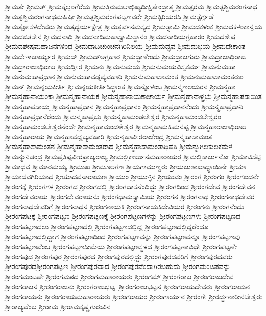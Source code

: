 {ಶ್ರೀಮತೇ
ಶ್ರೀಮತ್
ಶ್ರೀಮತ್ಕೆಲ್ಲಂಗೆರೆಯ
ಶ್ರೀಮತ್ತಿರುಮಲಾಭಿಖ್ಯದೀಕ್ಷಿತೇಂದ್ರಾತ್ಮ
ಶ್ರೀಮತ್ಪರಮ
ಶ್ರೀಮತ್ಪಶ್ಚಿಮರಂಗನಾಥ
ಶ್ರೀಮತ್ಪಶ್ಚಿಮರಂಗನಾಥಮಹಿಷೀ
ಶ್ರೀಮತ್ಪಶ್ಚಿಮರಂಗಪಟ್ಟಣವರೇ
ಶ್ರೀಮತ್ಪಿರಿಯರಸಿ
ಶ್ರೀಮತ್ಪೆರ್ಗ್ಗಡೆ
ಶ್ರೀಮತ್ಪೋಸಳದೇವರು
ಶ್ರೀಮತ್ಸದ್ಭರ್ಯಕ್ಷೇತ್ರ
ಶ್ರೀಮತ್ಸರ್ವನಮಸ್ಯದ
ಶ್ರೀಮತ್ಸಾಮಿ
ಶ್ರೀಮದಕಳಂಕ
ಶ್ರೀಮದಕಳಂಕಾನ್ವಯ
ಶ್ರೀಮದಜಿತಸೇನ
ಶ್ರೀಮದನಾದಿ
ಶ್ರೀಮದನಾದಿಮಹಾಸ್ವಾಮಿಸ್ಥಾನಂ
ಶ್ರೀಮದನಾದಿಯಗ್ರಹಾರಂ
ಶ್ರೀಮದಶೇಷ
ಶ್ರೀಮದಶೇಷಮಹಾಜನಗಳಿಂದ
ಶ್ರೀಮದಾದಿಚುಂಚನಗಿರಿನಿಲಯ
ಶ್ರೀಮದುದ್ಭವ
ಶ್ರೀಮದುಭಯ
ಶ್ರೀಮದೇಕಾಂತ
ಶ್ರೀಮದೇಳಾಚಾರ್ಯ್ಯರ
ಶ್ರೀಮದ್
ಶ್ರೀಮದ್ಅಗ್ರಹಾರ
ಶ್ರೀಮದ್ಭಾಳೇಂದು
ಶ್ರೀಮದ್ರಾಜಗುರು
ಶ್ರೀಮದ್ರಾಜಾಧಿರಾಜ
ಶ್ರೀಮದ್ರಾರಾಜಾಧಿರಾಜ
ಶ್ರೀಮದ್ವೀರ
ಶ್ರೀಮನು
ಶ್ರೀಮನುಮಯ
ಶ್ರೀಮನುಮಯವಿಸ್ವಕರ್ಮ
ಶ್ರೀಮನುಮಹಾ
ಶ್ರೀಮನುಮಹಾಪ್ರಧಾನ
ಶ್ರೀಮನುಮಹಾವಡ್ಡವ್ಯವಹಾರಿ
ಶ್ರೀಮನುಮಹಾಸಾಮಂತ
ಶ್ರೀಮನುಮಹಾಸಾಮಂತರುಂ
ಶ್ರೀಮನ್
ಶ್ರೀಮನ್ನಯಕೀರ್ತಿ
ಶ್ರೀಮನ್ನಯಕೀರ್ತಿಸಿದ್ಧಾಂತ
ಶ್ರೀಮನ್ನೊಳಂಬ
ಶ್ರೀಮನ್ಮಣಲಯರನ
ಶ್ರೀಮನ್ಮಹಾ
ಶ್ರೀಮನ್ಮಹಾನಾಯಂಕಾ
ಶ್ರೀಮನ್ಮಹಾನಾಯಕ
ಶ್ರೀಮನ್ಮಹಾನಾಯಕಾಚಾರ್ಯ
ಶ್ರೀಮನ್ಮಹಾನಾಳ್ಪ್ರಭು
ಶ್ರೀಮನ್ಮಹಾಪಸಾಯಿತ
ಶ್ರೀಮನ್ಮಹಾಪಸಾಯ್ತ
ಶ್ರೀಮನ್ಮಹಾಪ್ರಧಾನ
ಶ್ರೀಮನ್ಮಹಾಪ್ರಧಾನಂ
ಶ್ರೀಮನ್ಮಹಾಪ್ರಧಾನನೆಂದು
ಶ್ರೀಮನ್ಮಹಾಪ್ರಧಾನಿ
ಶ್ರೀಮನ್ಮಹಾಪ್ರಧಾನೆರೆಂದು
ಶ್ರೀಮನ್ಮಹಾಪ್ರಭು
ಶ್ರೀಮನ್ಮಹಾಮಂಡಲೇಶ್ವರ
ಶ್ರೀಮನ್ಮಹಾಮಂಡಲೇಶ್ವರಂ
ಶ್ರೀಮನ್ಮಹಾಮಂಡಲೇಶ್ವರನೆಂದೇ
ಶ್ರೀಮನ್ಮಹಾಮಂಡಳೇಶ್ವರ
ಶ್ರೀಮನ್ಮಹಾಮಹಿಮನಪ್ಪ
ಶ್ರೀಮನ್ಮಹಾರಾಜಾಧಿರಾಜ
ಶ್ರೀಮನ್ಮಹಾರಾಯ
ಶ್ರೀಮನ್ಮಹಾವಡ್ಡಬ್ಯವಹಾರಿ
ಶ್ರೀಮನ್ಮಹಾವೀರರಾಜೇಂದ್ರ
ಶ್ರೀಮನ್ಮಹಾಸಾಮಂತ
ಶ್ರೀಮನ್ಮಹಾಸಾಮಂತನ
ಶ್ರೀಮನ್ಮಹಾಸಾಮಂತರಾದ
ಶ್ರೀಮನ್ಮಹಾಸಾಮಂತಾಧಿಪತಿ
ಶ್ರೀಮನ್ಮುಗಿಲಕುಲಕಮಳ
ಶ್ರೀಮನ್ಮುನಿಚಂದ್ರ
ಶ್ರೀಮಪ್ರತಿಷ್ಟವೀರಪ್ರಾಜ್ಯರಾಜ್ಯ
ಶ್ರೀಮಲ್ಲಿಕಾರ್ಜುನಮಹಾರಾಯರ
ಶ್ರೀಮಲ್ಲಿಕಾರ್ಜುನೋ
ಶ್ರೀಮಾಚಿಸೆಟ್ಟಿ
ಶ್ರೀಮಾಧವ
ಶ್ರೀಮಾರಮಯ್ಯ
ಶ್ರೀಮುಖ
ಶ್ರೀಮೂಲಗಣ
ಶ್ರೀಯಗಾಮುಣ್ಡರು
ಶ್ರೀಯಜುಶಾಖಾಧ್ಯಾಯಿನೇ
ಶ್ರೀಯಾ
ಶ್ರೀಯಾದವಗಿರಿಯಾದ
ಶ್ರೀಯಾದವನಾರಾಯಣ
ಶ್ರೀಯುಂ
ಶ್ರೀಯುಳ್ಳಿನ
ಶ್ರೀಯುವಂ
ಶ್ರೀರಂಗ
ಶ್ರೀರಂಗಂ
ಶ್ರೀರಂಗಐದನೇ
ಶ್ರೀರಂಗಕ್ಕೆ
ಶ್ರೀರಂಗಗಳ
ಶ್ರೀರಂಗದ
ಶ್ರೀರಂಗದಲ್ಲಿ
ಶ್ರೀರಂಗದಾಸನೆಂದಿದ್ದು
ಶ್ರೀರಂಗದಿಂದ
ಶ್ರೀರಂಗದೇವ
ಶ್ರೀರಂಗದೇವನ
ಶ್ರೀರಂಗದೇವರಾಯ
ಶ್ರೀರಂಗದೇವರಾಯನು
ಶ್ರೀರಂಗಧಾಮಸ್ವಾಮಿಯ
ಶ್ರೀರಂಗನ
ಶ್ರೀರಂಗನಾಥ
ಶ್ರೀರಂಗನಾಥದೇವರ
ಶ್ರೀರಂಗನಾಥದೇವರಿಗೆ
ಶ್ರೀರಂಗನಾಥನ
ಶ್ರೀರಂಗನಾಯಕಿ
ಶ್ರೀರಂಗನಾಯಕಿದೇವಿಯರ
ಶ್ರೀರಂಗನು
ಶ್ರೀರಂಗನೆಂದು
ಶ್ರೀರಂಗಪಟಕ್ಕೆ
ಶ್ರೀರಂಗಪಟ್ಟಣ
ಶ್ರೀರಂಗಪಟ್ಟಣಕ್ಕೆ
ಶ್ರೀರಂಗಪಟ್ಟಣಗಳನ್ನು
ಶ್ರೀರಂಗಪಟ್ಟಣಗಳು
ಶ್ರೀರಂಗಪಟ್ಟಣದ
ಶ್ರೀರಂಗಪಟ್ಟಣದಲು
ಶ್ರೀರಂಗಪಟ್ಟಣದಲ್ಲಿ
ಶ್ರೀರಂಗಪಟ್ಟಣದಲ್ಲಿದ್ದ
ಶ್ರೀರಂಗಪಟ್ಟಣದಲ್ಲಿದ್ದರೆಂದೂ
ಶ್ರೀರಂಗಪಟ್ಟಣದಲ್ಲಿದ್ದಾಗ
ಶ್ರೀರಂಗಪಟ್ಟಣದಿಂದ
ಶ್ರೀರಂಗಪಟ್ಟಣವನ್ನು
ಶ್ರೀರಂಗಪಟ್ಟಣವನ್ನೂ
ಶ್ರೀರಂಗಪಟ್ಟಣವು
ಶ್ರೀರಂಗಪಟ್ಟಣವೆಂಬ
ಶ್ರೀರಂಗಪಟ್ಟಣಸೀಮೆಯ
ಶ್ರೀರಂಗಪಟ್ಟಣಸ್ಥಳದ
ಶ್ರೀರಂಗಪಟ್ಟಣಾಭಿಧೇ
ಶ್ರೀರಂಗಪಟ್ಟಣೇ
ಶ್ರೀರಂಗಪುದ
ಶ್ರೀರಂಗಪುರ
ಶ್ರೀರಂಗಪುರದ
ಶ್ರೀರಂಗಪುರದಲ್ಲಿದ್ದು
ಶ್ರೀರಂಗಪುರದವರಿಗೆ
ಶ್ರೀರಂಗಪುರದವರು
ಶ್ರೀರಂಗಪುರದಶ್ರೀರಂಗಪಟ್ಟಣ
ಶ್ರೀರಂಗಪುರವಾದ
ಶ್ರೀರಂಗಪುರವೆಂದಾಗಿರಬಹುದು
ಶ್ರೀರಂಗಮಂಟಪವನ್ನು
ಶ್ರೀರಂಗಮಂಟಪೇ
ಶ್ರೀರಂಗಮಠದ
ಶ್ರೀರಂಗಮಹಾರಾಯರು
ಶ್ರೀರಂಗಮ್
ಶ್ರೀರಂಗರಾಜ
ಶ್ರೀರಂಗರಾಜದೇವ
ಶ್ರೀರಂಗರಾಜನ
ಶ್ರೀರಂಗರಾಜನು
ಶ್ರೀರಂಗರಾಜಭಟ್ಟಃ
ಶ್ರೀರಂಗರಾಜಭಟ್ಟನ
ಶ್ರೀರಂಗರಾಯದೇವರು
ಶ್ರೀರಂಗರಾಯನ
ಶ್ರೀರಂಗರಾಯನು
ಶ್ರೀರಂಗರಾಯಮಹಾರಾಯರು
ಶ್ರೀರಂಗರಾಯರ
ಶ್ರೀರಂಗಾರ್ಯನ
ಶ್ರೀರಂಗೇ
ಶ್ರೀರರ್ದ್ಧನಾರೀನಟೇಶ್ವರಃ
ಶ್ರೀರಾಜ್ಯವೆಂಬ
ಶ್ರೀರಾಮ
ಶ್ರೀರಾಮಕೃಷ್ಣಗುರುವಿನ
}
